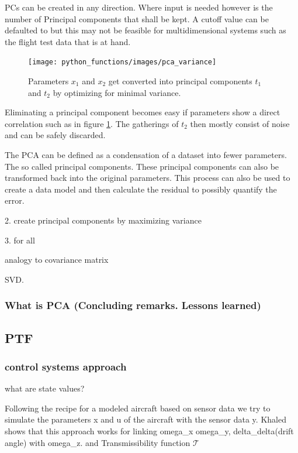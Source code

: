 PCs can be created in any direction. Where input is needed however is the number of Principal components that shall be kept. A cutoff value can be defaulted to but this may not be feasible for multidimensional systems such as the flight test data that is at hand.


\begin{figure}
    \centering
    \texttt{[image: python\_functions/images/pca\_variance]}
    \caption{Parameters $x_1$ and $x_2$ get converted into principal components $t_1$ and $t_2$ by optimizing for minimal variance.}
    \label{fig:pca_variance}
\end{figure}

Eliminating a principal component becomes easy if parameters show a direct correlation such as in figure \ref{fig:pca_variance}. The gatherings of $t_2$ then mostly consist of noise and can be safely discarded.



The PCA can be defined as a condensation of a dataset into fewer parameters. The so called principal components. These principal components can also be transformed back into the original parameters. This process can also be used to create a data model and then calculate the residual to possibly quantify the error.


2. create principal components by maximizing variance

3. for all

analogy to covariance matrix

SVD.

\subsubsection{What is PCA (Concluding remarks. Lessons learned)}

\subsection{ PTF}

\subsubsection{control systems approach}

what are state values?


Following the recipe for a modeled aircraft based on sensor data we try to simulate the parameters x and u of the aircraft with the sensor data y. Khaled shows that this approach works for linking omega_x omega_y, delta_delta(drift angle) with omega_z. and Transmissibility function  $\mathcal{T}$


